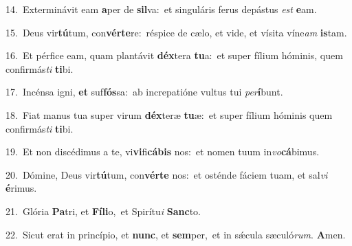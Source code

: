 {\numbfont\textcolor{\numbcolor}{14.}}~Exterminávit eam \textbf{a}\-per de \textbf{sil}\-va:~\star et singuláris ferus depástus \textit{est} \textbf{e}\-am.\par
{\numbfont\textcolor{\numbcolor}{15.}}~Deus vir\-\textbf{tú}\-tum, con\-\textbf{vér}\-\textbf{te}re:~\star réspice de cælo, et vide, et vísita víne\textit{am} \textbf{is}\-tam.\par
{\numbfont\textcolor{\numbcolor}{16.}}~Et pérfice eam, quam plantávit \textbf{déx}\-tera \textbf{tu}\-a:~\star et super fílium hóminis, quem confirmás\textit{ti} \textbf{ti}\-bi.\par
{\numbfont\textcolor{\numbcolor}{17.}}~Incénsa igni, \textbf{et} suf\-\textbf{fós}\-sa:~\star ab increpatióne vultus tui \textit{per}\-\textbf{í}bunt.\par
{\numbfont\textcolor{\numbcolor}{18.}}~Fiat manus tua super virum \textbf{déx}\-teræ \textbf{tu}\-æ:~\star et super fílium hóminis quem confirmás\textit{ti} \textbf{ti}\-bi.\par
{\numbfont\textcolor{\numbcolor}{19.}}~Et non discédimus a te, vi\-\textbf{vi}\-fi\-\textbf{cá}\-\textbf{bis} nos:~\star et nomen tuum in\-\textit{vo}\-\textbf{cá}bimus.\par
{\numbfont\textcolor{\numbcolor}{20.}}~Dómine, Deus vir\-\textbf{tú}\-tum, con\-\textbf{vér}\-\textbf{te} nos:~\star et osténde fáciem tuam, et sal\textit{vi} \textbf{é}\-rimus.\par
{\numbfont\textcolor{\numbcolor}{21.}}~Glória \textbf{Pa}\-tri, et \textbf{Fí}\-\textbf{li}o,~\star et Spirítu\textit{i} \textbf{Sanc}\-to.\par
{\numbfont\textcolor{\numbcolor}{22.}}~Sicut erat in princípio, et \textbf{nunc}\-, et \textbf{sem}\-per,~\star et in sǽcula sæculó\-\textit{rum}\-. \textbf{A}\-men.\par
